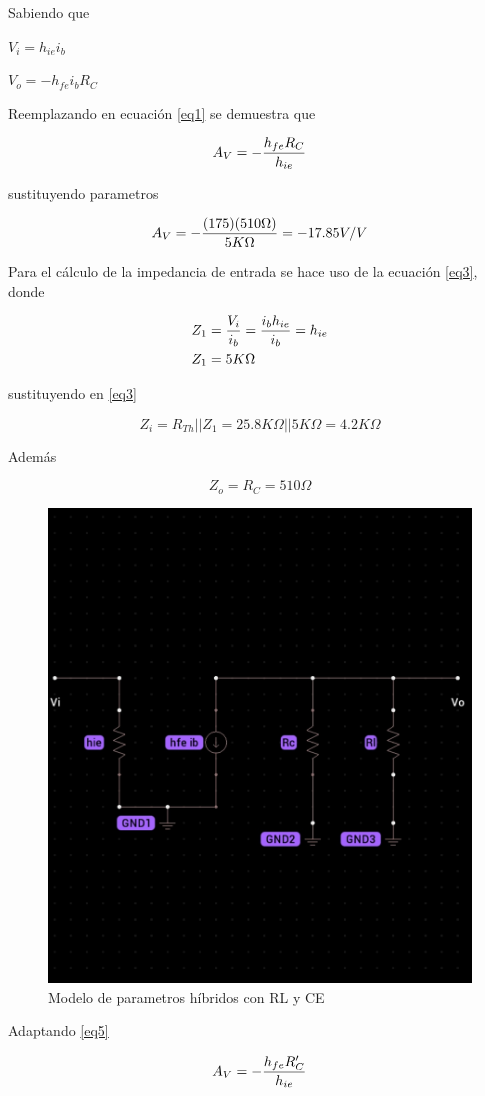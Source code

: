 \documentclass[12pt, a4paper]{article}
\begin{document}
    Sabiendo que

    $V_i = h_{ie}i_b$

    $V_o = -h_{fe}i_bR_C$

    Reemplazando en ecuación \eqref{eq1} se demuestra que

    \begin{equation}
        A_V = -{h_{fe}R_C \over h_{ie}}
        \label{eq5}
    \end{equation}

    sustituyendo parametros

    $$A_V = -{(175)(510\Omega) \over 5K\Omega} = -17.85 V/V$$

    Para el cálculo de la impedancia de entrada se hace uso de la ecuación \eqref{eq3}, donde

    \begin{equation*}
        \begin{split}
            Z_1 & = {V_i \over i_b} = \frac{i_bh_{ie}}{i_b} = h_{ie} \\
            Z_1 & = 5K\Omega
        \end{split}
    \end{equation*}  

    sustituyendo en \eqref{eq3}

    $$Z_i = R_{Th}||Z_1 = 25.8K\Omega||5K\Omega = 4.2K\Omega$$

    Además

    $$Z_o = R_C = 510\Omega$$

    \begin{figure}[h!]
        \centering
        \includegraphics[height=4cm\textwidth]{h4.jpg} \par
        \caption{Modelo de parametros híbridos con RL y CE}
        \label{fig:h4}
    \end{figure}

    Adaptando \ref{eq5}

    \begin{equation}
        A_V = -{h_{fe}R'_C \over h_{ie}}
        \label{eq6}
    \end{equation}
\end{document}
